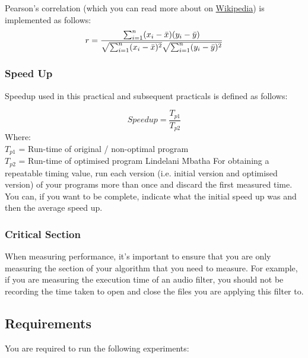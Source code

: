 Pearson's correlation (which you can read more about on \href{https://en.wikipedia.org/wiki/Pearson_correlation_coefficient}{Wikipedia}) is implemented as follows:
\begin{equation}
\label{eqn:Pearson}
  r =
  \frac{ \sum_{i=1}^{n}(x_i-\bar{x})(y_i-\bar{y}) }{%
        \sqrt{\sum_{i=1}^{n}(x_i-\bar{x})^2}\sqrt{\sum_{i=1}^{n}(y_i-\bar{y})^2}}
\end{equation}

\subsubsection{Speed Up}
Speedup used in this practical and subsequent practicals is defined as follows:

\begin{equation}
Speedup = \frac{T_{p1}}{T_{p2}}
\end{equation}
Where:\\
$T_{p1}$ = Run-time of original / non-optimal program\\
$T_{p2}$ = Run-time of optimised program
Lindelani Mbatha
For obtaining a repeatable timing value, run each version (i.e. initial version and optimised version) of your programs more than once and discard the first measured time. You can, if you want to be complete, indicate what the initial speed up was and then the average speed up.

\subsubsection{Critical Section}
When measuring performance, it's important to ensure that you are only measuring the section of your algorithm that you need to measure. For example, if you are measuring the execution time of an audio filter, you should not be recording the time taken to open and close the files you are applying this filter to.

\newpage

\subsection{Requirements}
You are required to run the following experiments:
